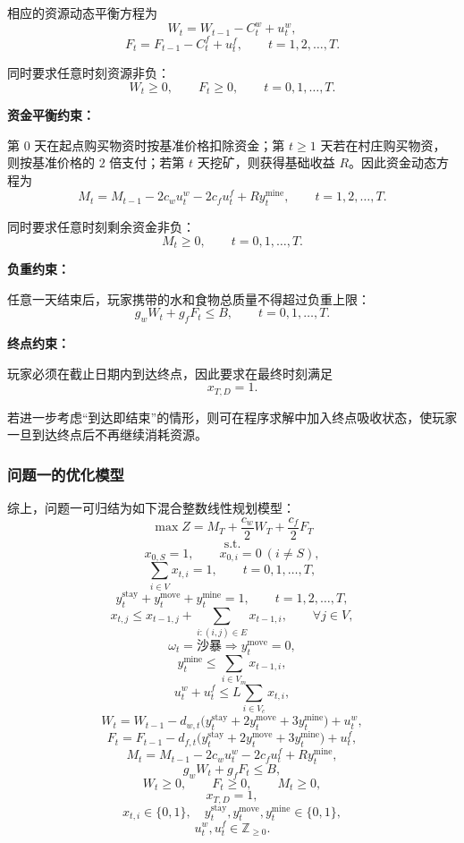 \documentclass[UTF8,a4paper,12pt]{ctexart}
\begin{document}
相应的资源动态平衡方程为
\[
W_t=W_{t-1}-C_t^w+u_t^w,
\]
\[
F_t=F_{t-1}-C_t^f+u_t^f,
\qquad t=1,2,\dots,T.
\]

同时要求任意时刻资源非负：
\[
W_t\ge 0,\qquad F_t\ge 0,\qquad t=0,1,\dots,T.
\]

\noindent\textbf{资金平衡约束：}

第 $0$ 天在起点购买物资时按基准价格扣除资金；第 $t\ge 1$ 天若在村庄购买物资，则按基准价格的 $2$ 倍支付；若第 $t$ 天挖矿，则获得基础收益 $R$。因此资金动态方程为
\[
M_t=M_{t-1}-2c_wu_t^w-2c_fu_t^f+Ry_t^{\mathrm{mine}},
\qquad t=1,2,\dots,T.
\]

同时要求任意时刻剩余资金非负：
\[
M_t\ge 0,\qquad t=0,1,\dots,T.
\]

\noindent\textbf{负重约束：}

任意一天结束后，玩家携带的水和食物总质量不得超过负重上限：
\[
g_wW_t+g_fF_t\le B,\qquad t=0,1,\dots,T.
\]

\noindent\textbf{终点约束：}

玩家必须在截止日期内到达终点，因此要求在最终时刻满足
\[
x_{T,D}=1.
\]

若进一步考虑“到达即结束”的情形，则可在程序求解中加入终点吸收状态，使玩家一旦到达终点后不再继续消耗资源。

\subsubsection{问题一的优化模型}

综上，问题一可归结为如下混合整数线性规划模型：
\[
\max Z=M_T+\frac{c_w}{2}W_T+\frac{c_f}{2}F_T
\]
\[
\text{s.t.}
\]
\[
x_{0,S}=1,\qquad x_{0,i}=0\ (i\neq S),
\]
\[
\sum_{i\in V}x_{t,i}=1,\qquad t=0,1,\dots,T,
\]
\[
y_t^{\mathrm{stay}}+y_t^{\mathrm{move}}+y_t^{\mathrm{mine}}=1,\qquad t=1,2,\dots,T,
\]
\[
x_{t,j}\le x_{t-1,j}+\sum_{i:(i,j)\in E}x_{t-1,i},\qquad \forall j\in V,
\]
\[
\omega_t=\text{沙暴} \Longrightarrow y_t^{\mathrm{move}}=0,
\]
\[
y_t^{\mathrm{mine}}\le \sum_{i\in V_m}x_{t-1,i},
\]
\[
u_t^w+u_t^f \le L\sum_{i\in V_c}x_{t,i},
\]
\[
W_t=W_{t-1}-d_{w,t}\bigl(y_t^{\mathrm{stay}}+2y_t^{\mathrm{move}}+3y_t^{\mathrm{mine}}\bigr)+u_t^w,
\]
\[
F_t=F_{t-1}-d_{f,t}\bigl(y_t^{\mathrm{stay}}+2y_t^{\mathrm{move}}+3y_t^{\mathrm{mine}}\bigr)+u_t^f,
\]
\[
M_t=M_{t-1}-2c_wu_t^w-2c_fu_t^f+Ry_t^{\mathrm{mine}},
\]
\[
g_wW_t+g_fF_t\le B,
\]
\[
W_t\ge 0,\qquad F_t\ge 0,\qquad M_t\ge 0,
\]
\[
x_{T,D}=1,
\]
\[
x_{t,i}\in\{0,1\},\quad y_t^{\mathrm{stay}},y_t^{\mathrm{move}},y_t^{\mathrm{mine}}\in\{0,1\},
\]
\[
u_t^w,u_t^f\in\mathbb{Z}_{\ge 0}.
\]
\end{document}
